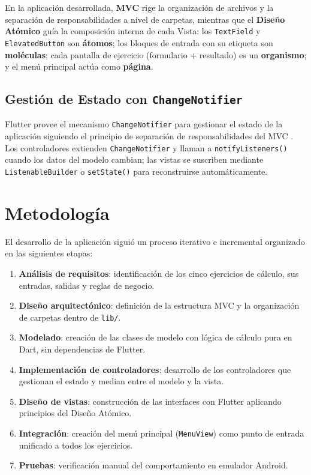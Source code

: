 \documentclass[12pt,a4paper]{article}
\begin{document}
En la aplicación desarrollada, \textbf{MVC} rige la organización de archivos y la separación de responsabilidades a nivel de carpetas, mientras que el \textbf{Diseño Atómico} guía la composición interna de cada Vista: los \texttt{TextField} y \texttt{ElevatedButton} son \textbf{átomos}; los bloques de entrada con su etiqueta son \textbf{moléculas}; cada pantalla de ejercicio (formulario + resultado) es un \textbf{organismo}; y el menú principal actúa como \textbf{página}.

\subsection{Gestión de Estado con \texttt{ChangeNotifier}}

Flutter provee el mecanismo \texttt{ChangeNotifier} para gestionar el estado de la aplicación siguiendo el principio de separación de responsabilidades del MVC \cite{flutter2024state}. Los controladores extienden \texttt{ChangeNotifier} y llaman a \texttt{notifyListeners()} cuando los datos del modelo cambian; las vistas se suscriben mediante \texttt{ListenableBuilder} o \texttt{setState()} para reconstruirse automáticamente.

\section{Metodología}

El desarrollo de la aplicación siguió un proceso iterativo e incremental organizado en las siguientes etapas:

\begin{enumerate}
  \item \textbf{Análisis de requisitos}: identificación de los cinco ejercicios de cálculo, sus entradas, salidas y reglas de negocio.
  \item \textbf{Diseño arquitectónico}: definición de la estructura MVC y la organización de carpetas dentro de \texttt{lib/}.
  \item \textbf{Modelado}: creación de las clases de modelo con lógica de cálculo pura en Dart, sin dependencias de Flutter.
  \item \textbf{Implementación de controladores}: desarrollo de los controladores que gestionan el estado y median entre el modelo y la vista.
  \item \textbf{Diseño de vistas}: construcción de las interfaces con Flutter aplicando principios del Diseño Atómico.
  \item \textbf{Integración}: creación del menú principal (\texttt{MenuView}) como punto de entrada unificado a todos los ejercicios.
  \item \textbf{Pruebas}: verificación manual del comportamiento en emulador Android.
\end{enumerate}
\end{document}
